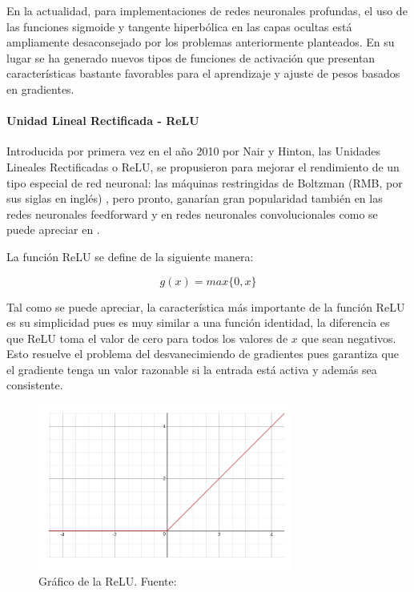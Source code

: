             En la actualidad, para implementaciones de redes neuronales profundas, el uso de las funciones sigmoide y tangente 
            hiperbólica en las capas ocultas está ampliamente desaconsejado por los problemas anteriormente planteados. En su 
            lugar se ha generado nuevos tipos de funciones de activación que presentan características bastante favorables 
            para el aprendizaje y ajuste de pesos basados en gradientes.

            \paragraph{Unidad Lineal Rectificada - ReLU}
            Introducida por primera vez en el año 2010 por Nair y Hinton, las Unidades Lineales Rectificadas o ReLU, se 
            propusieron para mejorar el rendimiento de un tipo especial de red neuronal: las máquinas restringidas de Boltzman 
            (RMB, por sus siglas en inglés) \cite{nair2010rectified}, pero pronto, ganarían gran popularidad también en las 
            redes neuronales feedforward y en redes neuronales convolucionales como se puede apreciar en \cite{krizhevsky2012imagenet}.
            
            La función ReLU se define de la siguiente manera:

            \begin{equation}\label{eq:relu}
                g(x) = max\{0,x\}
            \end{equation}

            Tal como se puede apreciar, la característica más importante de la función ReLU es su simplicidad pues es muy 
            similar a una función identidad, la diferencia es que ReLU toma el valor de cero para todos los valores de $x$ que 
            sean negativos. Esto resuelve el problema del desvanecimiendo de gradientes pues garantiza que el gradiente 
            tenga un valor razonable si la entrada está activa y además sea consistente.

            \begin{figure}[!h] 
                \centering
                \includegraphics[width=0.75\textwidth]{img/relu}
                \caption{Gráfico de la ReLU. Fuente: \cite{wang_2016} }
                \label{fig:relu}
            \end{figure}

